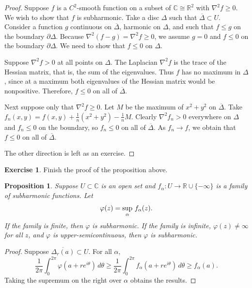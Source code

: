 \documentclass[12pt,openany]{book}
\newcommand{\avoidbreak}{\postdisplaypenalty=100}
\newcommand{\C}{{\mathbb{C}}}
\newcommand{\R}{{\mathbb{R}}}
\theoremstyle{plain}
\newtheorem{prop}[thm]{Proposition}
\theoremstyle{remark}
\theoremstyle{definition}
\newenvironment{exbox}{%
    \def\FrameCommand{\vrule width 1pt \relax\hspace{10pt}}%
    \MakeFramed{\advance\hsize-\width\FrameRestore}%
}{%
    \endMakeFramed
}
\theoremstyle{exercise}
\newtheorem{exercise}{Exercise}[section]
\theoremstyle{example}
\begin{document}
\begin{proof}
Suppose $f$ is a $C^2$-smooth function on a subset of $\C \cong \R^2$
with $\nabla^2 f \geq 0$.  We wish to show that $f$ is subharmonic.
Take a disc $\Delta$ such that $\overline{\Delta} \subset U$.
Consider a function
$g$ continuous on $\overline{\Delta}$,
harmonic on $\Delta$, and such that
$f \leq g$ on the boundary $\partial \Delta$.  Because
$\nabla^2 (f-g) = \nabla^2 f \geq 0$, we assume $g = 0$ and $f \leq 0$
on the boundary $\partial \Delta$.
We need to show that $f \leq 0$ on $\Delta$.

Suppose $\nabla^2 f > 0$ at all points on $\Delta$.
The Laplacian $\nabla^2 f$ is the trace of the Hessian matrix,
that is, the sum of the eigenvalues.  Thus $f$ has no maximum
in $\Delta$, since at a maximum both eigenvalues of the Hessian matrix
would be nonpositive.
Therefore, $f \leq 0$ on all of $\overline{\Delta}$.

Next suppose only that $\nabla^2 f \geq 0$.
Let $M$ be the maximum of $x^2+y^2$ on $\overline{\Delta}$.
Take $f_n(x,y) = f(x,y) + \frac{1}{n}
( x^2+y^2 ) - \frac{1}{n}M$.  Clearly $\nabla^2 f_n > 0$ everywhere on
$\Delta$ and
$f_n \leq 0$ on the boundary, so $f_n \leq 0$
on all of $\overline{\Delta}$.  As $f_n \to f$, we obtain that
$f \leq 0$ on all of $\overline{\Delta}$.

The other direction is left as an exercise.
\end{proof}

\begin{exbox}
\begin{exercise}
Finish the proof of the proposition above.
\end{exercise}
\end{exbox}

\begin{prop}
\pagebreak[2]%
Suppose $U \subset \C$ is an open set and $f_\alpha \colon U \to \R \cup \{ -\infty \}$
is a family of subharmonic functions.  Let
\begin{equation*}
\varphi(z) = \sup_\alpha\, f_\alpha(z) .
\avoidbreak
\end{equation*}
If the family is finite, then $\varphi$ is subharmonic.
If the family is infinite, $\varphi(z) \not= \infty$ for
all $z$, and $\varphi$
is upper-semicontinuous, then $\varphi$ is subharmonic.
\end{prop}

\begin{proof}
Suppose $\overline{\Delta_r(a)} \subset U$.  For all $\alpha$,
\begin{equation*}
\frac{1}{2\pi} \int_0^{2\pi} \varphi (a+re^{i\theta})\, d\theta
\geq
\frac{1}{2\pi} \int_0^{2\pi} f_\alpha (a+re^{i\theta})\, d\theta
\geq f_\alpha(a) .
\end{equation*}
Taking the supremum on the right over $\alpha$ obtains the results.
\end{proof}
\end{document}
